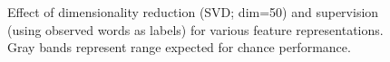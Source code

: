 \documentclass[11pt]{article}
\begin{document}
\begin{figure}[ht!]
\centering
{}%
%
%
\caption{Effect of dimensionality reduction (SVD; dim=50) and supervision (using observed words as labels) for various feature representations. Gray bands represent range expected for chance performance.}
\label{fig:dimred}
\end{figure}
\end{document}
